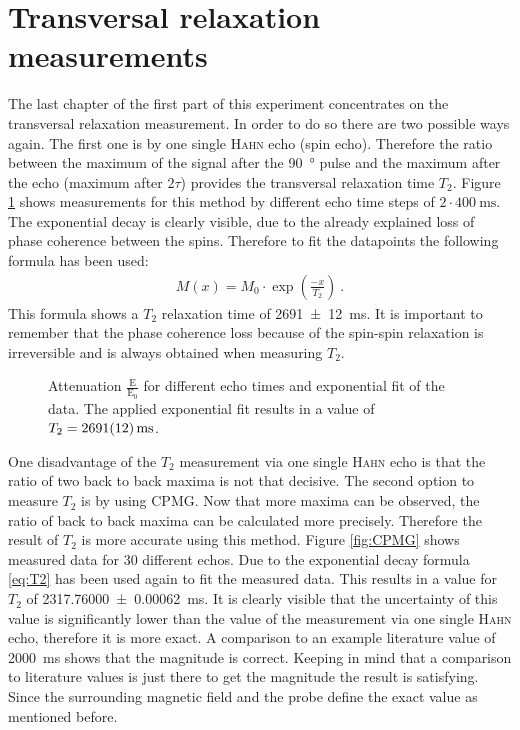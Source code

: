 \section{Transversal relaxation measurements}
\label{sec:Transversalrelaxationmeasurements}
The last chapter of the first part of this experiment concentrates on the transversal relaxation measurement.
In order to do so there are two possible ways again.\newline
The first one is by one single \textsc{Hahn} echo (spin echo).
Therefore the ratio between the maximum of the signal after the \SI{90}{\degree} pulse and the maximum after the echo (maximum after $2\tau$) provides the transversal relaxation time $T_2$.
Figure \ref{fig:T2} shows measurements for this method by different echo time steps of $2\cdot \SI{400}{\milli \second}$.
The exponential decay is clearly visible, due to the already explained loss of phase coherence between the spins.
Therefore to fit the datapoints the following formula has been used:
\begin{align}
    M(x)=M_0 \cdot \exp\left(\frac{-x}{T_{2}}\right) \ .
 \label{eq:T2}
\end{align}
This formula shows a $T_2$ relaxation time of \SI{2691 \pm 12}{\milli \second}.
It is important to remember that the phase coherence loss because of the spin-spin relaxation is irreversible and is always obtained when measuring $T_2$.

\begin{figure}[H]
    \centering
    
    \caption[Attenuation $\frac{\text{E}}{\text{E}_0}$ for different echo times and exponential fit of the data.]{Attenuation $\frac{\text{E}}{\text{E}_0}$ for different echo times and exponential fit of the data.
    The applied exponential fit results in a value of $T_2 = \SI{2691 \pm 12}{\milli \second}$.}
    \label{fig:T2}
\end{figure}

One disadvantage of the $T_2$ measurement via one single \textsc{Hahn} echo is that the ratio of two back to back maxima is not that decisive.
The second option to measure $T_2$ is by using CPMG. Now that more maxima can be observed, the ratio of back to back maxima can be calculated more precisely.
Therefore the result of $T_2$ is more accurate using this method.
Figure \ref{fig:CPMG} shows measured data for 30 different echos.
Due to the exponential decay formula \eqref{eq:T2} has been used again to fit the measured data.
This results in a value for $T_2$ of \SI{2317.76000 \pm 0.00062}{\milli \second}.
It is clearly visible that the uncertainty of this value is significantly lower than the value of the measurement via one single \textsc{Hahn} echo, therefore it is more exact.
A comparison to an example literature value of \SI{2000}{\milli \second} \cite{literaturT1} shows that the magnitude is correct.
Keeping in mind that a comparison to literature values is just there to get the magnitude the result is satisfying.
Since the surrounding magnetic field and the probe define the exact value as mentioned before.

